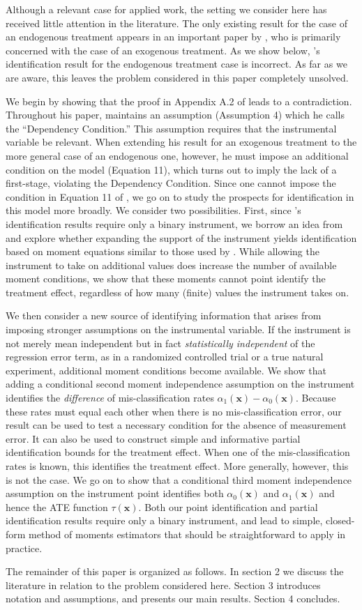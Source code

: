 Although a relevant case for applied work, the setting we consider here has received little attention in the literature.
The only existing result for the case of an endogenous treatment appears in an important paper by \cite{Mahajan}, who is primarily concerned with the case of an exogenous treatment.
As we show below, \citeauthor{Mahajan}'s identification result for the endogenous treatment case is incorrect.
As far as we are aware, this leaves the problem considered in this paper completely unsolved.

We begin by showing that the proof in Appendix A.2 of \cite{Mahajan} leads to a contradiction.
Throughout his paper, \cite{Mahajan} maintains an assumption (Assumption 4) which he calls the ``Dependency Condition.'' 
This assumption requires that the instrumental variable be relevant.
When extending his result for an exogenous treatment to the more general case of an endogenous one, however, he must impose an additional condition on the model (Equation 11), which turns out to imply the lack of a first-stage, violating the Dependency Condition.
Since one cannot impose the condition in Equation 11 of \cite{Mahajan}, we go on to study the prospects for identification in this model more broadly.
We consider two possibilities.
First, since \citeauthor{Mahajan}'s identification results require only a binary instrument,  we borrow an idea from \cite{Lewbel} and explore whether expanding the support of the instrument yields identification based on moment equations similar to those used by \cite{Mahajan}.
While allowing the instrument to take on additional values does increase the number of available moment conditions, we show that these moments cannot point identify the treatment effect, regardless of how many (finite) values the instrument takes on.

We then consider a new source of identifying information that arises from imposing stronger assumptions on the instrumental variable.
If the instrument is not merely mean independent but in fact \emph{statistically independent} of the regression error term, as in a randomized controlled trial or a true natural experiment, additional moment conditions become available.
We show that adding a conditional second moment independence assumption on the instrument identifies the \emph{difference} of mis-classification rates $\alpha_1(\mathbf{x})-\alpha_0(\mathbf{x})$. 
Because these rates must equal each other when there is no mis-classification error, our result can be used to test a necessary condition for the absence of measurement error.   
It can also be used to construct simple and informative partial identification bounds for the treatment effect.
When one of the mis-classification rates is known, this identifies the treatment effect.
More generally, however, this is not the case.
We go on to show that a conditional third moment independence assumption on the instrument point identifies both $\alpha_0(\mathbf{x})$ and $\alpha_1(\mathbf{x})$ and hence the ATE function $\tau(\mathbf{x})$. 
Both our point identification and partial identification results require only a binary instrument, and lead to simple, closed-form method of moments estimators that should be straightforward to apply in practice.

The remainder of this paper is organized as follows. 
In section 2 we discuss the literature in relation to the problem considered here. 
Section 3 introduces notation and assumptions, and presents our main results.
Section 4 concludes.

